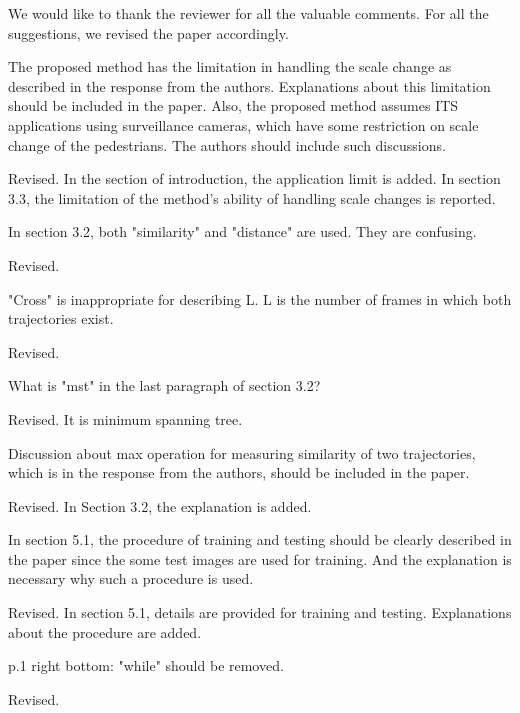 \documentclass{mva2011}
\begin{document}
{\color{blue}
{\color{black}We would like to thank the reviewer for all the valuable comments. For all the suggestions, we revised the paper accordingly.}
\newline

The proposed method has the limitation in handling the scale change as described in the response from the authors. Explanations about this limitation should be included in the paper. Also, the proposed method assumes ITS applications using surveillance cameras, which have some restriction on scale change of the pedestrians. The authors should include such discussions.

{\color{black}Revised. In the section of introduction, the application limit is added. In section 3.3, the limitation of the method's ability of handling scale changes is reported.}
\newline

In section 3.2, both "similarity" and "distance" are used. They are confusing.

{\color{black}Revised.}
\newline

"Cross" is inappropriate for describing L. L is the number of frames in which both trajectories exist.

{\color{black}Revised.}
\newline

What is "mst" in the last paragraph of section 3.2?

{\color{black}Revised. It is minimum spanning tree.}
\newline

Discussion about max operation for measuring similarity of two trajectories, which is in the response from the authors, should be included in the paper.

{\color{black}Revised. In Section 3.2, the explanation is added.}
\newline

In section 5.1, the procedure of training and testing should be clearly described in the paper since the some test images are used for training. And the explanation is necessary why such a procedure is used.

{\color{black}Revised. In section 5.1, details are provided for training and testing. Explanations about the procedure are added. }
\newline

p.1 right bottom: "while" should be removed.

{\color{black}Revised.}



}
\end{document}
